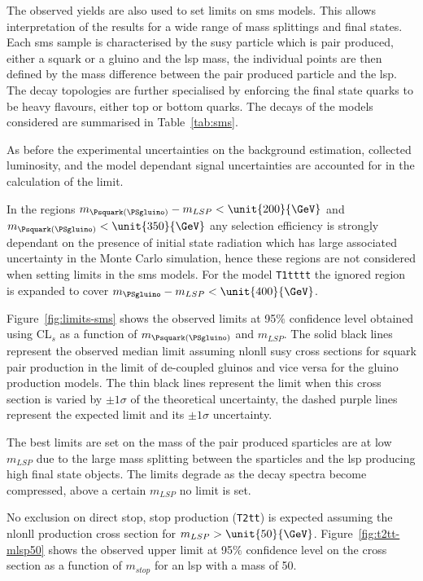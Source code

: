 The observed yields are also used to set limits on \ac{sms} models. This allows 
interpretation of the results for a wide range of mass splittings and final 
states. Each \ac{sms} sample is characterised by the \ac{susy} particle which 
is pair produced, either a squark or a gluino and the \ac{lsp} mass, the 
individual points are then defined by the mass difference between the pair 
produced particle and the \ac{lsp}.
The decay topologies are further specialised by enforcing the final state 
quarks to be heavy flavours, either top or bottom quarks. The decays of the 
models considered are summarised in Table~\ref{tab:sms}.

As before the experimental uncertainties on the background estimation, 
collected luminosity, and the model dependant signal uncertainties are 
accounted for in the calculation of the limit.

In the regions $m_{\Psquark(\PSgluino)} - m_{LSP} < \unit{200}{\GeV}$ and 
$m_{\Psquark(\PSgluino)} < \unit{350}{\GeV}$ any selection efficiency is 
strongly dependant on the presence of initial state radiation which has large 
associated uncertainty in the Monte Carlo simulation, hence these regions are 
not considered when setting limits in the \ac{sms} models. For the model 
\texttt{T1tttt} the ignored region is expanded to cover $m_{\PSgluino} - 
m_{LSP} < \unit{400}{\GeV}$.

Figure~\ref{fig:limits-sms} shows the observed limits at 95$\%$ confidence level obtained using CL$_{s}$ as a function of $m_{\Psquark(\PSgluino)}$ and $m_{LSP}$. The solid black lines represent the observed median limit assuming \ac{nlonll}\cite{Beenakker:1996ch,susy-nlo-nll} \ac{susy} cross sections for squark pair production in the limit of de-coupled gluinos and vice versa for the gluino production models. The thin black lines represent the limit when this cross section is varied by $\pm1\sigma$ of the theoretical uncertainty, the dashed purple lines represent the expected limit and its $\pm1\sigma$ uncertainty.

The best limits are set on the mass of the pair produced sparticles are at low $m_{LSP}$ due to the large mass splitting between the sparticles and the \ac{lsp} producing high \pt final state objects. The limits degrade as the decay spectra become compressed, above a certain $m_{LSP}$ no limit is set.

No exclusion on direct stop, stop production (\texttt{T2tt}) is expected assuming the \ac{nlonll} production cross section for $m_{LSP} > \unit{50}{\GeV}$. Figure~\ref{fig:t2tt-mlsp50} shows the observed upper limit at 95$\%$ confidence level on the cross section as a function of $m_{stop}$ for an \ac{lsp} with a mass of \unit{50}{\GeV}.


